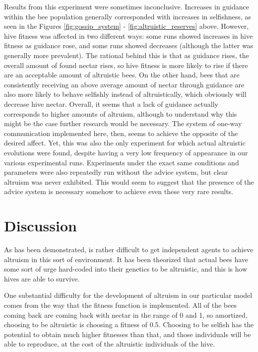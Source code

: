 \documentclass[twoside]{article}
\begin{document}
\begin{multicols}{2}
            Results from this experiment were sometimes inconclusive. Increases in guidance within the bee population generally corresponded with increases in selfishness, as seen in the Figures \ref{fig:gossip_system} - \ref{fig:altruistic_reserves} above.  However, hive fitness was affected in two different ways: some runs showed increases in hive fitness as guidance rose, and some runs showed decreases (although the latter was generally more prevalent). The rational behind this is that as guidance rises, the overall amount of found nectar rises, so hive fitness is more likely to rise if there are an acceptable amount of altruistic bees. On the other hand, bees that are consistently receiving an above average amount of nectar through guidance are also more likely to behave selfishly instead of altruistically, which obviously will decrease hive nectar. Overall, it seems that a lack of guidance actually corresponds to higher amounts of altruism, although to understand why this might be the case further research would be necessary. The system of one-way communication implemented here, then, seems to achieve the opposite of the desired affect. Yet, this was also the only experiment for which actual altruistic evolutions were found, despite having a very low frequency of appearance in our various experimental runs. Experiments under the exact same conditions and parameters were also repeatedly run without the advice system, but clear altruism was never exhibited. This would seem to suggest that the presence of the advice system is necessary somehow to achieve even these very rare results.


	\section{Discussion} %
	\label{sec:discussion}

		As has been demonstrated, is rather difficult to get independent agents to achieve altruism in this sort of environment. It has been theorized that actual bees have some sort of urge hard-coded into their genetics to be altruistic, and this is how hives are able to survive. \cite{macy}

		One substantial difficulty for the development of altruism in our particular model comes from the way that the fitness function is implemented. All of the bees coming back are coming back with nectar in the range of 0 and 1, so amortized, choosing to be altruistic is choosing a fitness of $0.5$. Choosing to be selfish has the potential to obtain much higher fitnesses than that, and those individuals will be able to reproduce, at the cost of the altruistic individuals of the hive.


\end{multicols}
\end{document}
